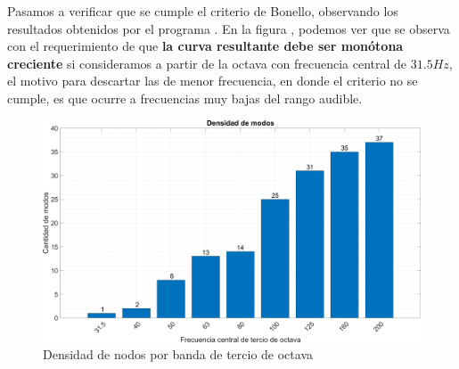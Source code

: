 \par Pasamos a verificar que se cumple el criterio de Bonello, observando los resultados obtenidos por el programa . En la figura , podemos ver que se observa con el requerimiento de que \textbf{la curva resultante debe ser monótona creciente} si consideramos a partir de la octava con frecuencia central de $31.5Hz$, el motivo para descartar las de menor frecuencia, en donde el criterio no se cumple, es que ocurre a frecuencias muy bajas del rango audible.


\begin{figure}[H]
	\centering
	\includegraphics[width=1\textwidth]{./img/modos_resonancia.png}
	\caption{Densidad de nodos por banda de tercio de octava}
	\label{fig:modos_resonancia}
\end{figure}

\newpage

